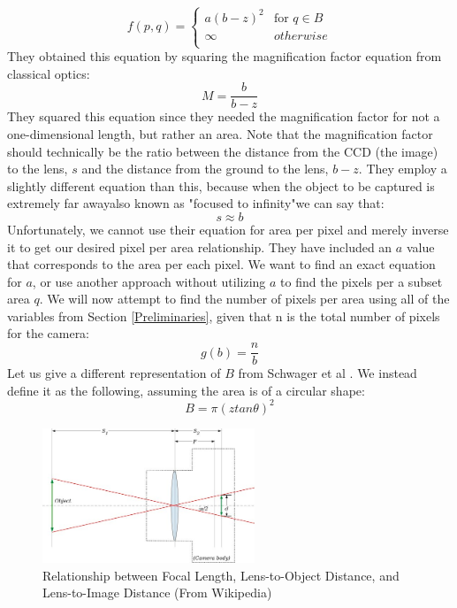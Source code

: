 \documentclass[conference]{IEEEtran}
\theoremstyle{plain}%
\begin{document}
\begin{equation*}
 f(p,q)=  \left\{
\begin{array}{ll}
      a(b-z)^2 & \text{for } q \in B \\
      \infty & otherwise \\
\end{array} 
\right.
\end{equation*}
They obtained this equation by squaring the magnification factor equation from classical optics:
\begin{equation}
M=\frac{b}{b-z}
\end{equation}
They squared this equation since they needed the magnification factor for not a one-dimensional length, but rather an area.
Note that the magnification factor should technically be the ratio between the distance from the CCD (the image) to the lens, $s$ and the distance from the ground to the lens, $b-z$. They employ a slightly different equation than this, because when the object to be captured is extremely far away\textemdash also known as "focused to infinity"\textemdash we can say that:
\begin{equation}
s \approx b
\end{equation}
Unfortunately, we cannot use their equation for area per pixel and merely inverse it to get our desired pixel per area relationship. They have included an $a$ value that corresponds to the area per each pixel. We want to find an exact equation for $a$, or use another approach without utilizing $a$ to find the pixels per a subset area $q$.
We will now attempt to find the number of pixels per area using all of the variables from Section \ref{Preliminaries}, given that n is the total number of pixels for the camera:
\begin{equation}
g(b) =  \frac{n}{b}
\end{equation}
Let us give a different representation of $B$ from Schwager et al \cite{schwager2011eyes}. We instead define it as the following, assuming the area is of a circular shape:
\begin{equation}
B = \pi (z tan \theta)^2
\end{equation}

\begin{figure}[!t]
\centering
\includegraphics[width=2.5in]{optics}
\caption{Relationship between Focal Length, Lens-to-Object Distance, and Lens-to-Image Distance (From Wikipedia)}
\label{optics}
\end{figure}
\end{document}

